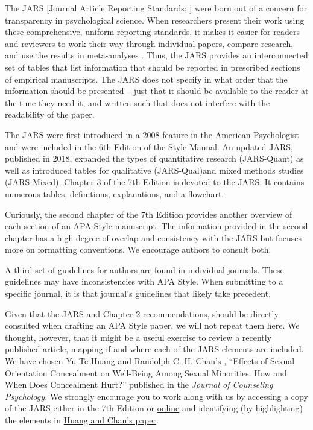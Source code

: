 \documentclass[
  11pt,
]{book}
\begin{document}
The JARS {[}Journal Article Reporting Standards; \citet{appelbaum_journal_2018}{]} were born out of a concern for transparency in psychological science. When researchers present their work using these comprehensive, uniform reporting standards, it makes it easier for readers and reviewers to work their way through individual papers, compare research, and use the results in meta-analyses \citep{american_psychological_association_publication_2020}. Thus, the JARS provides an interconnected set of tables that list information that should be reported in prescribed sections of empirical manuscripts. The JARS does not specify in what order that the information should be presented -- just that it should be available to the reader at the time they need it, and written such that does not interfere with the readability of the paper.

The JARS were first introduced in a 2008 feature in the American Psychologist \citep{noauthor_reporting_2008} and were included in the 6th Edition of the Style Manual. An updated JARS, published in 2018, expanded the types of quantitative research (JARS-Quant) as well as introduced tables for qualitative (JARS-Qual)and mixed methods studies (JARS-Mixed). Chapter 3 of the 7th Edition is devoted to the JARS. It contains numerous tables, definitions, explanations, and a flowchart.

Curiously, the second chapter of the 7th Edition provides another overview of each section of an APA Style manuscript. The information provided in the second chapter has a high degree of overlap and consistency with the JARS but focuses more on formatting conventions. We encourage authors to consult both.

A third set of guidelines for authors are found in individual journals. These guidelines may have inconsistencies with APA Style. When submitting to a specific journal, it is that journal's guidelines that likely take precedent.

Given that the JARS and Chapter 2 recommendations, should be directly consulted when drafting an APA Style paper, we will not repeat them here. We thought, however, that it might be a useful exercise to review a recently published article, mapping if and where each of the JARS elements are included. We have chosen Yu-Te Huang and Randolph C. H. Chan's \citeyearpar{huang_effects_2022}, ``Effects of Sexual Orientation Concealment on Well-Being Among Sexual Minorities: How and When Does Concealment Hurt?'' published in the \emph{Journal of Counseling Psychology.} We strongly encourage you to work along with us by accessing a copy of the JARS either in the 7th Edition or \href{https://apastyle.apa.org/jars/quantitative}{online} and identifying (by highlighting) the elements in \href{https://pubmed.ncbi.nlm.nih.gov/35696152/}{Huang and Chan's paper}.
\end{document}
